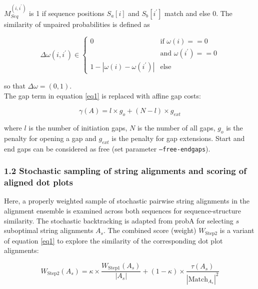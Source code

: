 \documentclass{bmcart}
\begin{document}
\noindent  $M_{Seq}^{(i,i^\prime)}$ is 1 if sequence positions $S_a[i]$ and
$S_b[i^\prime]$ match and else 0. The similarity of unpaired probabilities is
defined as

\begin{equation}\label{eq3}
	\Delta \omega(i,i^\prime) \in \left\{ \begin{array}{cl}
			0 & \textrm{if } \omega(i) == 0 \\
			  & \textrm{and } \omega(i^\prime ) == 0 \\
			1 - | \omega(i) - \omega(i^\prime) | & \textrm{else}
		\end{array}\right.
\end{equation}

\noindent so that $\Delta \omega = (0,1)$. \\

The gap term in equation \ref{eq1} is replaced with affine gap costs:

\begin{equation}\label{eq6}
	\gamma(A) = l \times g_o + (N-l) \times g_{ext}
\end{equation}
	
\noindent where $l$ is the number of initiation gaps, $N$ is the number of all gaps,
$g_o$ is the penalty for opening a gap and $g_{ext}$ is the penalty for gap
extensions. Start and end gaps can be considered as free (set parameter \texttt{--free-endgaps}). \\

\subsubsection*{1.2 Stochastic sampling of string alignments and scoring of aligned dot plots}

Here, a properly weighted sample of stochastic pairwise string alignments
in the alignment ensemble is examined across both sequences for sequence-structure similarity.
The stochastic backtracking is adapted from probA \cite{Muckstein12385998} for
selecting $s$ suboptimal string alignments $A_s$.  The combined score (weight)
$W_{\mbox{Step2}}$ is a variant of equation \ref{eq1} to explore the similarity
of the corresponding dot plot alignments:

\begin{equation}\label{eq7}
	W_{\mbox{Step2}}(A_s) = \kappa \times \frac{W_{\mbox{Step1}}(A_s)}{|A_s|} + (1-\kappa) \times
	\frac{\tau(A_s)}{{|\mbox{Match}_{A_s}|}^2}
\end{equation}
\end{document}
